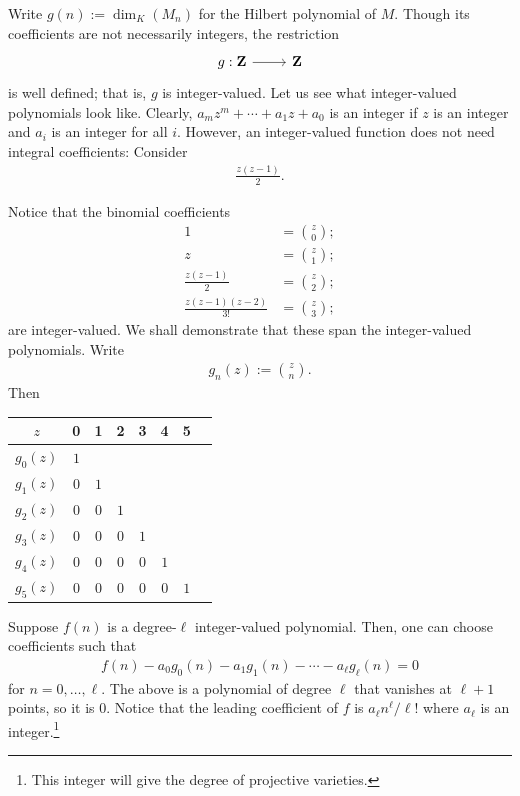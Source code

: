 \documentclass [11 pt, oneside] {article}
\begin{document}
Write $g(n) := \dim_K(M_n)$ for the Hilbert polynomial of $M$. Though its coefficients are not necessarily integers, the restriction
\[
\begin{tikzcd}
g:\mathbf{Z}\ar[r]& \mathbf{Z}
\end{tikzcd}
\]
is well defined; that is, $g$ is integer-valued. Let us see what integer-valued polynomials look like. Clearly, $a_mz^m + \cdots + a_1z + a_0$ is an integer if $z$ is an integer and $a_i$ is an integer for all $i$. However, an integer-valued function does not need integral coefficients: Consider
\begin{align*}
	\frac{z(z-1)}{2}.
\end{align*}

Notice that the binomial coefficients
\begin{align*}
	1 &= \binom{z}{0};\\
	z &= \binom{z}{1};\\
	\frac{z(z-1)}{2} &= \binom{z}{2};\\
	\frac{z(z-1) (z-2)}{3!}&= \binom{z}{3};
\end{align*}
are integer-valued. We shall demonstrate that these span the integer-valued polynomials. Write 
\begin{align*}
	g_n(z) := \binom{z}{n}.
\end{align*}
Then
\begin{center}
	\begin{tabular}{cccccccc}
		$z$&0&1&2&3&4&5\\
    		\midrule
		 $g_0(z)$& $1$ &     &     &    \\
		 $g_1(z)$& $0$ & $1$ &     &    \\
		 $g_2(z)$& $0$ & $0$ & $1$ &    \\
		 $g_3(z)$& $0$ & $0$ & $0$ & $1$\\
		 $g_4(z)$& $0$ & $0$ & $0$ & $0$ & $1$\\
		 $g_5(z)$& $0$ & $0$ & $0$ & $0$ & $0$ & $1$
	\end{tabular}
\end{center}
Suppose $f(n)$ is a degree-$\ell$ integer-valued polynomial. Then, one can choose coefficients such that
\begin{align*}
	f(n) -  a_0g_0(n) -  a_1g_1(n) - \cdots - a_\ell g_\ell (n) =0
\end{align*}
for $n = 0,\hdots, \ell$. The above is a polynomial of degree $\ell$ that vanishes at $\ell + 1$ points, so it is $0$. Notice that the leading coefficient of $f$ is $a_\ell n^\ell / \ell!$ where $a_\ell$ is an integer.\footnote{This integer will give the degree of projective varieties.}
\end{document}
